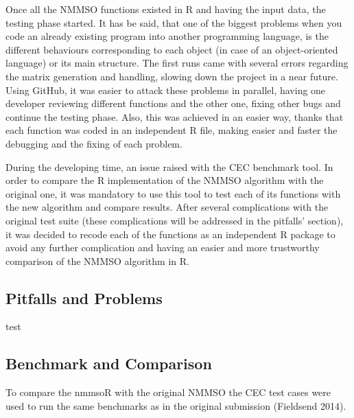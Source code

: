 \documentclass[12pt,a4paper]{article}
\begin{document}
Once all the NMMSO functions existed in R and having the input data, the
testing phase started. It has be said, that one of the biggest problems
when you code an already existing program into another programming
language, is the different behaviours corresponding to each object (in
case of an object-oriented language) or its main structure. The first
runs came with several errors regarding the matrix generation and
handling, slowing down the project in a near future. Using GitHub, it
was easier to attack these problems in parallel, having one developer
reviewing different functions and the other one, fixing other bugs and
continue the testing phase. Also, this was achieved in an easier way,
thanks that each function was coded in an independent R file, making
easier and faster the debugging and the fixing of each problem.

During the developing time, an issue raised with the CEC benchmark tool.
In order to compare the R implementation of the NMMSO algorithm with the
original one, it was mandatory to use this tool to test each of its
functions with the new algorithm and compare results. After several
complications with the original test suite (these complications will be
addressed in the pitfalls' section), it was decided to recode each of
the functions as an independent R package to avoid any further
complication and having an easier and more trustworthy comparison of the
NMMSO algorithm in R.

\subsection{Pitfalls and Problems}\label{pitfalls-and-problems}

test

\subsection{Benchmark and Comparison}\label{benchmark-and-comparison}

To compare the nmmsoR with the original NMMSO the CEC test cases were
used to run the same benchmarks as in the original submission (Fieldsend
2014).
\end{document}
